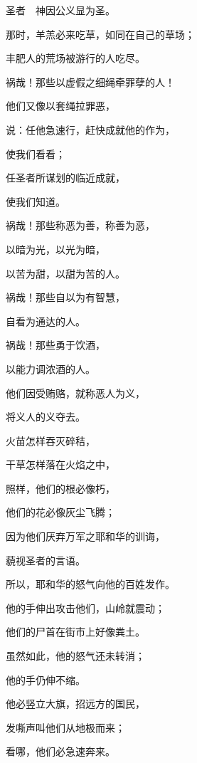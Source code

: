 {\par }{\Q 圣者　神因公义显为圣。
\par }{\Q {}那时，羊羔必来吃草，如同在自己的草场；
\par }{\Q 丰肥人的荒场被游行的人吃尽。
\par }{\BB \par }{\Q {}祸哉！那些以虚假之细绳牵罪孽的人！
\par }{\Q 他们又像以套绳拉罪恶，
\par }{\Q {}说：任他急速行，赶快成就他的作为，
\par }{\Q 使我们看看；
\par }{\Q 任{}圣者所谋划的临近成就，
\par }{\Q 使我们知道。
\par }{\Q {}祸哉！那些称恶为善，称善为恶，
\par }{\Q 以暗为光，以光为暗，
\par }{\Q 以苦为甜，以甜为苦的人。
\par }{\Q {}祸哉！那些自以为有智慧，
\par }{\Q 自看为通达的人。
\par }{\Q {}祸哉！那些勇于饮酒，
\par }{\Q 以能力调浓酒的人。
\par }{\Q {}他们因受贿赂，就称恶人为义，
\par }{\Q 将义人的义夺去。
\par }{\BB \par }{\Q {}火苗怎样吞灭碎秸，
\par }{\Q 干草怎样落在火焰之中，
\par }{\Q 照样，他们的根必像朽{}，
\par }{\Q 他们的花必像灰尘飞腾；
\par }{\Q 因为他们厌弃万军之耶和华的训诲，
\par }{\Q 藐视{}圣者的言语。
\par }{\Q {}所以，耶和华的怒气向他的百姓发作。
\par }{\Q 他的手伸出攻击他们，山岭就震动；
\par }{\Q 他们的尸首在街市上好像粪土。
\par }{\Q 虽然如此，他的怒气还未转消；
\par }{\Q 他的手仍伸不缩。
\par }{\Q {}他必竖立大旗，招远方的国民，
\par }{\Q 发嘶声叫他们从地极而来；
\par }{\Q 看哪，他们必急速奔来。
}
